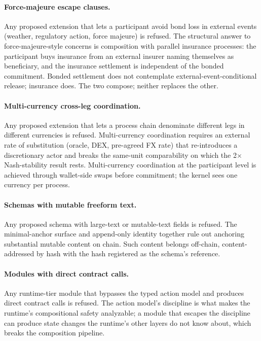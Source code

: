\documentclass[11pt,a4paper]{article}
\theoremstyle{definition}
\theoremstyle{remark}
\begin{document}
\paragraph{Force-majeure escape clauses.}
Any proposed extension that lets a participant avoid bond loss in
external events (weather, regulatory action, force majeure) is
refused. The structural answer to force-majeure-style concerns is
composition with parallel insurance processes: the participant
buys insurance from an external insurer naming themselves as
beneficiary, and the insurance settlement is independent of the
bonded commitment. Bonded settlement does not contemplate
external-event-conditional release; insurance does. The two compose;
neither replaces the other.

\paragraph{Multi-currency cross-leg coordination.}
Any proposed extension that lets a process chain denominate
different legs in different currencies is refused. Multi-currency
coordination requires an external rate of substitution (oracle,
DEX, pre-agreed FX rate) that re-introduces a discretionary actor
and breaks the same-unit comparability on which the 2$\times$
Nash-stability result rests. Multi-currency coordination at the
participant level is achieved through wallet-side swaps before
commitment; the kernel sees one currency per process.

\paragraph{Schemas with mutable freeform text.}
Any proposed schema with large-text or mutable-text fields is
refused. The minimal-anchor surface and append-only identity
together rule out anchoring substantial mutable content on chain.
Such content belongs off-chain, content-addressed by hash with the
hash registered as the schema's reference.

\paragraph{Modules with direct contract calls.}
Any runtime-tier module that bypasses the typed action model and
produces direct contract calls is refused. The action model's
discipline is what makes the runtime's compositional safety
analyzable; a module that escapes the discipline can produce
state changes the runtime's other layers do not know about, which
breaks the composition pipeline.
\end{document}

